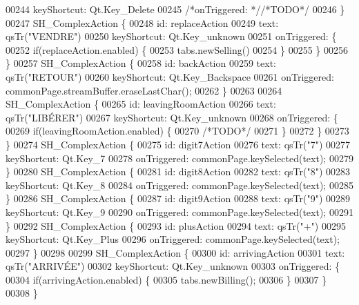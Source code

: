 \begin{DoxyCode}
00244         keyShortcut: Qt.Key\_Delete
00245         \textcolor{comment}{/*onTriggered: */}\textcolor{comment}{/*TODO*/}
00246     \}
00247     SH\_ComplexAction \{
00248         \textcolor{keywordtype}{id}: replaceAction
00249         text: qsTr(\textcolor{stringliteral}{"VENDRE"})
00250         keyShortcut: Qt.Key\_unknown
00251         onTriggered: \{
00252             \textcolor{keywordflow}{if}(replaceAction.enabled) \{
00253                 tabs.newSelling()
00254             \}
00255         \}
00256     \}
00257     SH\_ComplexAction \{
00258         \textcolor{keywordtype}{id}: backAction
00259         text: qsTr(\textcolor{stringliteral}{"RETOUR"})
00260         keyShortcut: Qt.Key\_Backspace
00261         onTriggered: commonPage.streamBuffer.eraseLastChar();
00262     \}
00263 
00264     SH\_ComplexAction \{
00265         \textcolor{keywordtype}{id}: leavingRoomAction
00266         text: qsTr(\textcolor{stringliteral}{"LIBÉRER"})
00267         keyShortcut: Qt.Key\_unknown
00268         onTriggered: \{
00269             \textcolor{keywordflow}{if}(leavingRoomAction.enabled) \{
00270                 \textcolor{comment}{/*TODO*/}
00271             \}
00272         \}
00273     \}
00274     SH\_ComplexAction \{
00275         \textcolor{keywordtype}{id}: digit7Action
00276         text: qsTr(\textcolor{stringliteral}{"7"})
00277         keyShortcut: Qt.Key\_7
00278         onTriggered: commonPage.keySelected(text);
00279     \}
00280     SH\_ComplexAction \{
00281         \textcolor{keywordtype}{id}: digit8Action
00282         text: qsTr(\textcolor{stringliteral}{"8"})
00283         keyShortcut: Qt.Key\_8
00284         onTriggered: commonPage.keySelected(text);
00285     \}
00286     SH\_ComplexAction \{
00287         \textcolor{keywordtype}{id}: digit9Action
00288         text: qsTr(\textcolor{stringliteral}{"9"})
00289         keyShortcut: Qt.Key\_9
00290         onTriggered: commonPage.keySelected(text);
00291     \}
00292     SH\_ComplexAction \{
00293         \textcolor{keywordtype}{id}: plusAction
00294         text: qsTr(\textcolor{stringliteral}{"+"})
00295         keyShortcut: Qt.Key\_Plus
00296         onTriggered: commonPage.keySelected(text);
00297     \}
00298 
00299     SH\_ComplexAction \{
00300         \textcolor{keywordtype}{id}: arrivingAction
00301         text: qsTr(\textcolor{stringliteral}{"ARRIVÉE"})
00302         keyShortcut: Qt.Key\_unknown
00303         onTriggered: \{
00304             \textcolor{keywordflow}{if}(arrivingAction.enabled) \{
00305                 tabs.newBilling();
00306             \}
00307         \}
00308     \}

\end{DoxyCode}
